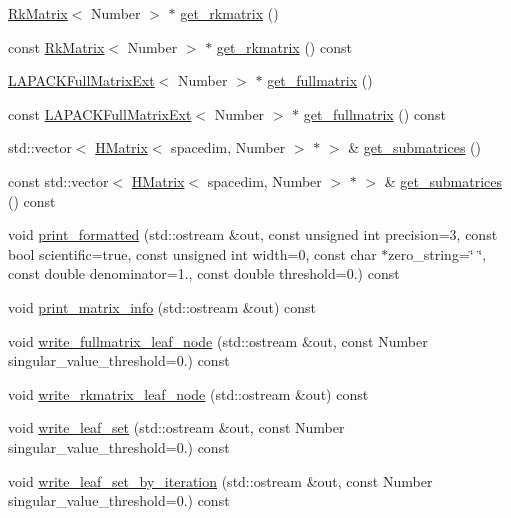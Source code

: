 \begin{DoxyCompactItemize}
\item 
\hyperlink{classRkMatrix}{Rk\+Matrix}$<$ Number $>$ $\ast$ \hyperlink{classHMatrix_a0189de6e276fbd3425c4a7ef132f5e16}{get\+\_\+rkmatrix} ()
\item 
const \hyperlink{classRkMatrix}{Rk\+Matrix}$<$ Number $>$ $\ast$ \hyperlink{classHMatrix_a64c81db6357d0e00b82fd523af001ae5}{get\+\_\+rkmatrix} () const
\item 
\hyperlink{classLAPACKFullMatrixExt}{L\+A\+P\+A\+C\+K\+Full\+Matrix\+Ext}$<$ Number $>$ $\ast$ \hyperlink{classHMatrix_a9d914c27d4e990d476a4529b2daa64cd}{get\+\_\+fullmatrix} ()
\item 
const \hyperlink{classLAPACKFullMatrixExt}{L\+A\+P\+A\+C\+K\+Full\+Matrix\+Ext}$<$ Number $>$ $\ast$ \hyperlink{classHMatrix_aed550b5b41a64c6f1bbcde4f8f7eca91}{get\+\_\+fullmatrix} () const
\item 
std\+::vector$<$ \hyperlink{classHMatrix}{H\+Matrix}$<$ spacedim, Number $>$ $\ast$ $>$ \& \hyperlink{classHMatrix_a0572b2c0484ce618db0034e3bc7988ed}{get\+\_\+submatrices} ()
\item 
const std\+::vector$<$ \hyperlink{classHMatrix}{H\+Matrix}$<$ spacedim, Number $>$ $\ast$ $>$ \& \hyperlink{classHMatrix_a8f8e9bc437ab86296d78950081ea34cd}{get\+\_\+submatrices} () const
\item 
void \hyperlink{classHMatrix_a7e849f7e8f35e3ebdfcb2dbb7ad4ad01}{print\+\_\+formatted} (std\+::ostream \&out, const unsigned int precision=3, const bool scientific=true, const unsigned int width=0, const char $\ast$zero\+\_\+string=\char`\"{} \char`\"{}, const double denominator=1., const double threshold=0.) const
\item 
void \hyperlink{classHMatrix_ad8f87883cf49080706233441c0e09171}{print\+\_\+matrix\+\_\+info} (std\+::ostream \&out) const
\item 
void \hyperlink{classHMatrix_a42f958a13c56d64564d59487e67bc8a2}{write\+\_\+fullmatrix\+\_\+leaf\+\_\+node} (std\+::ostream \&out, const Number singular\+\_\+value\+\_\+threshold=0.) const
\item 
void \hyperlink{classHMatrix_ac2c8ccd5763d3952505741c657b6468c}{write\+\_\+rkmatrix\+\_\+leaf\+\_\+node} (std\+::ostream \&out) const
\item 
void \hyperlink{classHMatrix_aaf0ae0960a40ad78a941aee823e80315}{write\+\_\+leaf\+\_\+set} (std\+::ostream \&out, const Number singular\+\_\+value\+\_\+threshold=0.) const
\item 
void \hyperlink{classHMatrix_aac1e1ddbfeb133520dcd50c0174aab8d}{write\+\_\+leaf\+\_\+set\+\_\+by\+\_\+iteration} (std\+::ostream \&out, const Number singular\+\_\+value\+\_\+threshold=0.) const

\end{DoxyCompactItemize}
